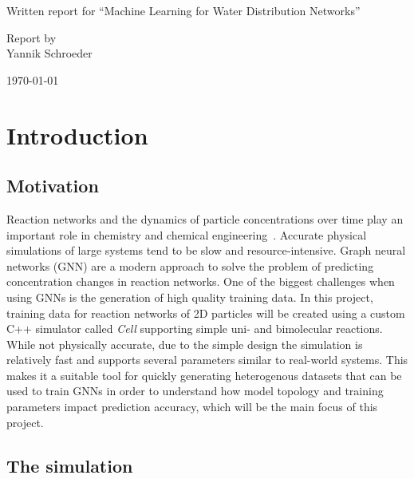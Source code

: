 \documentclass[a4paper]{scrartcl}
\begin{document}
\begin{center}
    {
        Written report for \enquote{Machine Learning for Water Distribution Networks}\\
    }

    \vspace{1.5cm}

    {\large
        Report by\\
        Yannik Schroeder
    }

    \vspace{1.5cm}

    \today

    \vspace*{\fill}
\end{center}

\clearpage
{}

\tableofcontents

\pagebreak


\section{Introduction}

\subsection{Motivation}
Reaction networks and the dynamics of particle concentrations over time play an important role in chemistry and chemical engineering~\cite{wikipedia_gnn}. Accurate physical simulations of large systems tend to be slow and resource-intensive. Graph neural networks (GNN) are a modern approach to solve the problem of predicting concentration changes in reaction networks. One of the biggest challenges when using GNNs is the generation of high quality training data. In this project, training data for reaction networks of 2D particles will be created using a custom C++ simulator called \textit{Cell} supporting simple uni- and bimolecular reactions. While not physically accurate, due to the simple design the simulation is relatively fast and supports several parameters similar to real-world systems. This makes it a suitable tool for quickly generating heterogenous datasets that can be used to train GNNs in order to understand how model topology and training parameters impact prediction accuracy, which will be the main focus of this project.

\subsection{The simulation}
\end{document}
